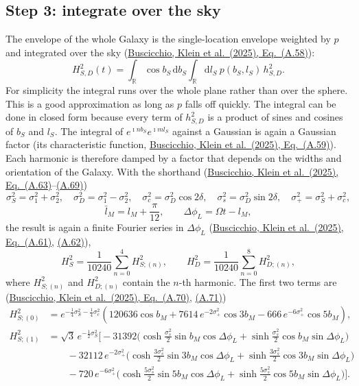 \documentclass[11pt,a4paper]{article}
\newcommand{\urlPtwo}{https://arxiv.org/pdf/2410.08263}
\newcommand{\PtwoEq}[1]{\href{\urlPtwo}{Buscicchio, Klein et al.~(2025), Eq.~(#1)}}
\newcommand{\dd}{\mathrm{d}}
\begin{document}
\subsection{Step 3: integrate over the sky}

The envelope of the whole Galaxy is the single-location envelope weighted by $p$ and
integrated over the sky (\PtwoEq{A.58}):
\begin{equation}
  H^2_{S,D}(t) = \int_{\mathbb{R}}\cos b_S\,\dd b_S\int_{\mathbb{R}}\dd l_S\
  p(b_S,l_S)\, h^2_{S,D}.
\end{equation}
For simplicity the integral runs over the whole plane rather than over the sphere.
This is a good approximation as long as $p$ falls off quickly. The integral can be
done in closed form because every term of $h^2_{S,D}$ is a product of sines and
cosines of $b_S$ and $l_S$. The integral of $e^{\imath n b_S}e^{\imath m l_S}$
against a Gaussian is again a Gaussian factor (its characteristic function,
\PtwoEq{A.59}). Each harmonic is therefore damped by a factor that depends on the
widths and orientation of the Galaxy. With the shorthand (\PtwoEq{A.63}--\href{\urlPtwo}{(A.69)})
\begin{equation}
  \sigma_S^2=\sigma_1^2+\sigma_2^2,\quad
  \sigma_D^2=\sigma_1^2-\sigma_2^2,\quad
  \sigma_c^2=\sigma_D^2\cos2\delta,\quad
  \sigma_s^2=\sigma_D^2\sin2\delta,\quad
  \sigma_+^2=\sigma_S^2+\sigma_c^2,
\end{equation}
\begin{equation}
  \bar l_M = l_M + \frac{\pi}{12},\qquad \Delta\phi_L = \Omega t - l_M,
\end{equation}
the result is again a finite Fourier series in $\Delta\phi_L$
(\PtwoEq{A.61}, \href{\urlPtwo}{(A.62)}),
\begin{equation}
  H_S^2 = \frac{1}{10240}\sum_{n=0}^{4} H^2_{S;(n)},\qquad
  H_D^2 = \frac{1}{10240}\sum_{n=0}^{8} H^2_{D;(n)},
\end{equation}
where $H^2_{S;(n)}$ and $H^2_{D;(n)}$ contain the $n$-th harmonic. The first two
terms are (\PtwoEq{A.70}, \href{\urlPtwo}{(A.71)})
\begin{align}
  H^2_{S;(0)} &= e^{-\frac14\sigma_S^2-\frac14\sigma_c^2}
  \left(120636\cos b_M + 7614\,e^{-2\sigma_+^2}\cos3b_M - 666\,e^{-6\sigma_+^2}\cos5b_M\right),\\
  H^2_{S;(1)} &= \sqrt3\,e^{-\frac12\sigma_S^2}\Big[
  -31392\Big(\cosh\tfrac{\sigma_s^2}{2}\sin b_M\cos\Delta\phi_L + \sinh\tfrac{\sigma_s^2}{2}\cos b_M\sin\Delta\phi_L\Big) \nonumber\\
  &\qquad -32112\,e^{-2\sigma_+^2}\Big(\cosh\tfrac{3\sigma_s^2}{2}\sin3b_M\cos\Delta\phi_L + \sinh\tfrac{3\sigma_s^2}{2}\cos3b_M\sin\Delta\phi_L\Big) \nonumber\\
  &\qquad -720\,e^{-6\sigma_+^2}\Big(\cosh\tfrac{5\sigma_s^2}{2}\sin5b_M\cos\Delta\phi_L + \sinh\tfrac{5\sigma_s^2}{2}\cos5b_M\sin\Delta\phi_L\Big)\Big].
\end{align}
\end{document}
